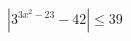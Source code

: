 \begin{ex}[type=inequality]
	\begin{condition}
	\( |3^{3x^2-23}-42|\le39 \)
	\end{condition}
	\answer{\( [-3;-2\sqrt{2}]\cup[2\sqrt{2};3] \)}
\end{ex}